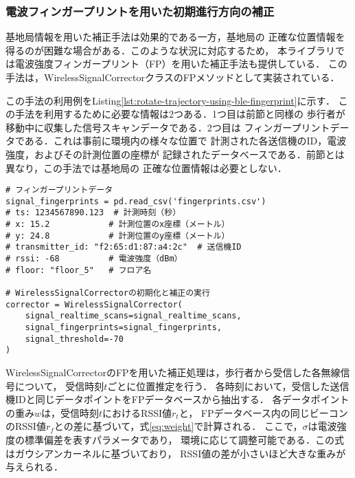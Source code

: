 
\subsubsection{電波フィンガープリントを用いた初期進行方向の補正}

基地局情報を用いた補正手法は効果的である一方，基地局の
正確な位置情報を得るのが困難な場合がある．このような状況に対応するため，
本ライブラリでは電波強度フィンガープリント（FP）を用いた補正手法も提供している．
この手法は，WirelessSignalCorrectorクラスのFPメソッドとして実装されている．

この手法の利用例をListing\ref{lst:rotate-trajectory-using-ble-fingerprint}に示す．
この手法を利用するために必要な情報は2つある．1つ目は前節と同様の
歩行者が移動中に収集した信号スキャンデータである．2つ目は
フィンガープリントデータである．これは事前に環境内の様々な位置で
計測された各送信機のID，電波強度，およびその計測位置の座標が
記録されたデータベースである．前節とは異なり，この手法では基地局の
正確な位置情報は必要としない．

\begin{lstlisting}[caption={WirelessSignalCorrectorの使用例},label=lst:rotate-trajectory-using-fingerprint,float=ht]
# フィンガープリントデータ
signal_fingerprints = pd.read_csv('fingerprints.csv')
# ts: 1234567890.123  # 計測時刻（秒）
# x: 15.2            # 計測位置のx座標（メートル）
# y: 24.8            # 計測位置のy座標（メートル）
# transmitter_id: "f2:65:d1:87:a4:2c"  # 送信機ID
# rssi: -68          # 電波強度（dBm）
# floor: "floor_5"   # フロア名

# WirelessSignalCorrectorの初期化と補正の実行
corrector = WirelessSignalCorrector(
    signal_realtime_scans=signal_realtime_scans,
    signal_fingerprints=signal_fingerprints,
    signal_threshold=-70
)
\end{lstlisting}


WirelessSignalCorrectorのFPを用いた補正処理は，歩行者から受信した各無線信号について，
受信時刻$t$ごとに位置推定を行う．
各時刻において，受信した送信機IDと同じデータポイントをFPデータベースから抽出する．
各データポイントの重み$w$は，受信時刻$t$におけるRSSI値$r_t$と，
FPデータベース内の同じビーコンのRSSI値$r_f$との差に基づいて，式\eqref{eq:weight}で計算される．
ここで，$\sigma$は電波強度の標準偏差を表すパラメータであり，
環境に応じて調整可能である．この式はガウシアンカーネルに基づいており，
RSSI値の差が小さいほど大きな重みが与えられる．

